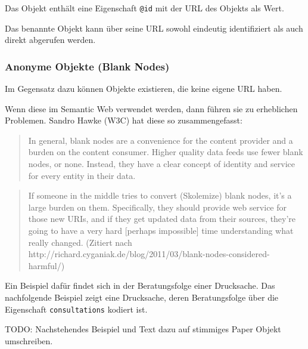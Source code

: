 \documentclass[,a4paper]{article}
\begin{document}
Das Objekt enthält eine Eigenschaft \texttt{@id} mit der URL des Objekts
als Wert.

Das benannte Objekt kann über seine URL sowohl eindeutig identifiziert
als auch direkt abgerufen werden.

\subsubsection{Anonyme Objekte (Blank Nodes)}\label{anonymeux5fobjekte}

Im Gegensatz dazu können Objekte existieren, die keine eigene URL haben.

Wenn diese im Semantic Web verwendet werden, dann führen sie zu
erheblichen Problemen. Sandro Hawke (W3C) hat diese so zusammengefasst:

\begin{quote}
In general, blank nodes are a convenience for the content provider and a
burden on the content consumer. Higher quality data feeds use fewer
blank nodes, or none. Instead, they have a clear concept of identity and
service for every entity in their data.
\end{quote}

\begin{quote}
If someone in the middle tries to convert (Skolemize) blank nodes, it's
a large burden on them. Specifically, they should provide web service
for those new URIs, and if they get updated data from their sources,
they're going to have a very hard {[}perhaps impossible{]} time
understanding what really changed. (Zitiert nach
http://richard.cyganiak.de/blog/2011/03/blank-nodes-considered-harmful/)
\end{quote}

Ein Beispiel dafür findet sich in der Beratungsfolge einer Drucksache.
Das nachfolgende Beispiel zeigt eine Drucksache, deren Beratungsfolge
über die Eigenschaft \texttt{consultations} kodiert ist.

TODO: Nachstehendes Beispiel und Text dazu auf stimmiges Paper Objekt
umschreiben.
\end{document}
